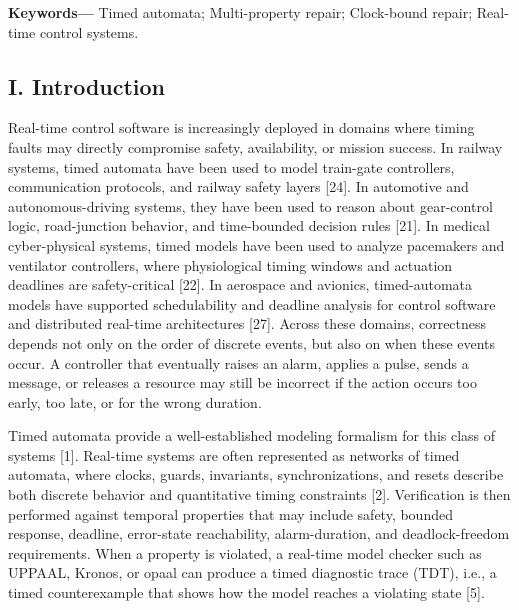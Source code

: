 \documentclass[
]{article}
\begin{document}
\textbf{Keywords---} Timed automata; Multi-property repair; Clock-bound
repair; Real-time control systems.

\subsection{I. Introduction}\label{i.-introduction}

Real-time control software is increasingly deployed in domains where
timing faults may directly compromise safety, availability, or mission
success. In railway systems, timed automata have been used to model
train-gate controllers, communication protocols, and railway safety
layers {[}24{]}. In automotive and autonomous-driving systems, they have
been used to reason about gear-control logic, road-junction behavior,
and time-bounded decision rules {[}21{]}. In medical cyber-physical
systems, timed models have been used to analyze pacemakers and
ventilator controllers, where physiological timing windows and actuation
deadlines are safety-critical {[}22{]}. In aerospace and avionics,
timed-automata models have supported schedulability and deadline
analysis for control software and distributed real-time architectures
{[}27{]}. Across these domains, correctness depends not only on the
order of discrete events, but also on when these events occur. A
controller that eventually raises an alarm, applies a pulse, sends a
message, or releases a resource may still be incorrect if the action
occurs too early, too late, or for the wrong duration.

Timed automata provide a well-established modeling formalism for this
class of systems {[}1{]}. Real-time systems are often represented as
networks of timed automata, where clocks, guards, invariants,
synchronizations, and resets describe both discrete behavior and
quantitative timing constraints {[}2{]}. Verification is then performed
against temporal properties that may include safety, bounded response,
deadline, error-state reachability, alarm-duration, and deadlock-freedom
requirements. When a property is violated, a real-time model checker
such as UPPAAL, Kronos, or opaal can produce a timed diagnostic trace
(TDT), i.e., a timed counterexample that shows how the model reaches a
violating state {[}5{]}.
\end{document}
